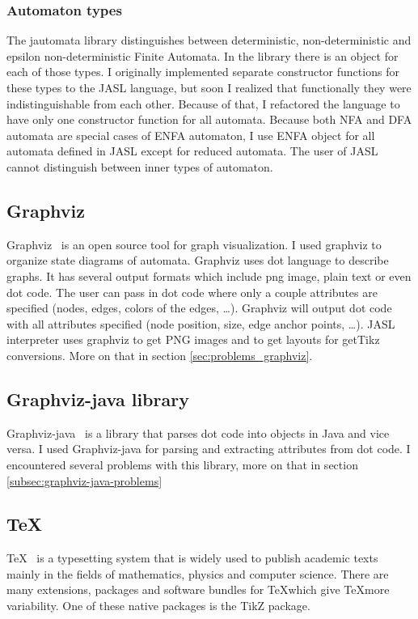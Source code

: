 \documentclass{ctuthesis}
\begin{document}
\subsubsection{Automaton types}
The jautomata library distinguishes between deterministic, non-deterministic and epsilon non-deterministic Finite Automata. In the library there is an object for each of those types. I originally implemented separate constructor functions for these types to the JASL language, but soon I realized that functionally they were indistinguishable from each other. Because of that, I refactored the language to have only one constructor function for all automata. Because both NFA and DFA automata are special cases of ENFA automaton, I use ENFA object for all automata defined in JASL except for reduced automata. The user of JASL cannot distinguish between inner types of automaton.


\subsection{Graphviz}

Graphviz~\cite{graphviz} is an open source tool for graph visualization. I used graphviz to organize state diagrams of automata. Graphviz uses dot language to describe graphs. It has several output formats which include png image, plain text or even dot code. The user can pass in dot code where only a couple attributes are specified (nodes, edges, colors of the edges, \ldots). Graphviz will output dot code with all attributes specified (node position, size, edge anchor points, \ldots).  JASL interpreter uses graphviz to get PNG images and to get layouts for getTikz conversions. More on that in section \ref{sec:problems_graphviz}.

\subsection{Graphviz-java library}
Graphviz-java~\cite{graphviz-java} is a library that parses dot code into objects in Java and vice versa. I used Graphviz-java for parsing and extracting attributes from dot code. I encountered several problems with this library, more on that in section \ref{subsec:graphviz-java-problems}

\subsection{\TeX}
\TeX~\cite{tex} is a typesetting system that is widely used to publish academic texts mainly in the fields of mathematics, physics and computer science. There are many extensions, packages and software bundles for \TeX which give \TeX more variability. One of these native packages is the TikZ package.
\end{document}
